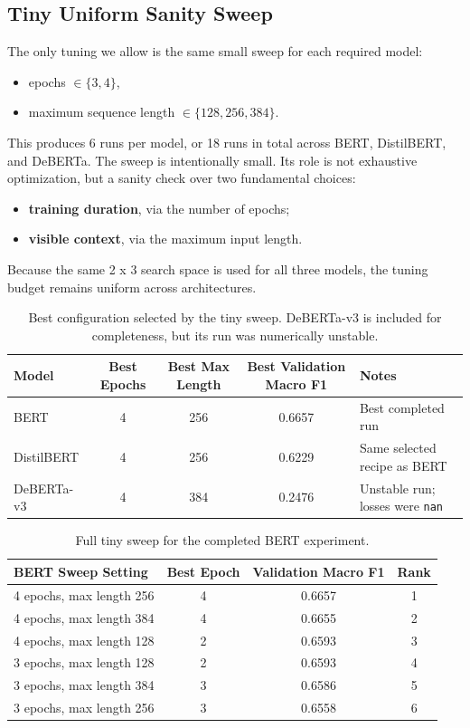 \subsection{Tiny Uniform Sanity Sweep}

The only tuning we allow is the same small sweep for each required model:
\begin{itemize}
	\item epochs $\in \{3, 4\}$,
	\item maximum sequence length $\in \{128, 256, 384\}$.
\end{itemize}

This produces 6 runs per model, or 18 runs in total across BERT, DistilBERT, and DeBERTa. The sweep is intentionally small. Its role is not exhaustive optimization, but a sanity check over two fundamental choices:
\begin{itemize}
	\item \textbf{training duration}, via the number of epochs;
	\item \textbf{visible context}, via the maximum input length.
\end{itemize}

Because the same 2 x 3 search space is used for all three models, the tuning budget remains uniform across architectures.

\begin{table}[h]
\centering
\small
\begin{tabularx}{\textwidth}{XcccX}
\toprule
Model & Best Epochs & Best Max Length & Best Validation Macro F1 & Notes \\
\midrule
BERT & 4 & 256 & 0.6657 & Best completed run \\
DistilBERT & 4 & 256 & 0.6229 & Same selected recipe as BERT \\
DeBERTa-v3 & 4 & 384 & 0.2476 & Unstable run; losses were \texttt{nan} \\
\bottomrule
\end{tabularx}
\caption{Best configuration selected by the tiny sweep. DeBERTa-v3 is included for completeness, but its run was numerically unstable.}
\label{tab:sweep-results}
\end{table}

\begin{table}[h]
\centering
\small
\begin{tabular}{lccc}
\toprule
BERT Sweep Setting & Best Epoch & Validation Macro F1 & Rank \\
\midrule
4 epochs, max length 256 & 4 & 0.6657 & 1 \\
4 epochs, max length 384 & 4 & 0.6655 & 2 \\
4 epochs, max length 128 & 2 & 0.6593 & 3 \\
3 epochs, max length 128 & 2 & 0.6593 & 4 \\
3 epochs, max length 384 & 3 & 0.6586 & 5 \\
3 epochs, max length 256 & 3 & 0.6558 & 6 \\
\bottomrule
\end{tabular}
\caption{Full tiny sweep for the completed BERT experiment.}
\label{tab:bert-sweep-full}
\end{table}

